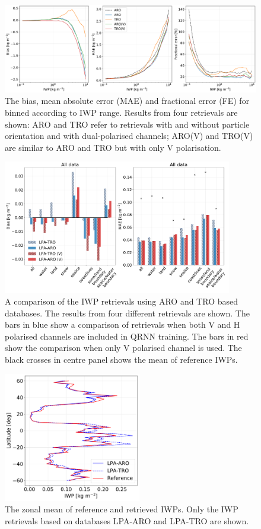 \documentclass[amt, manuscript]{copernicus}
\begin{document}
\begin{figure}[t]
	\includegraphics[width=12cm]{Figures/IWP_statistics.pdf}
	\caption{The bias, mean absolute error (MAE) and fractional error (FE) for binned according to IWP range. Results from four retrievals are shown: ARO and TRO refer to retrievals with and without particle orientation and with dual-polarised channels; ARO(V) and TRO(V) are similar to ARO and TRO but with only V polarisation. }
	\label{fig:IWP_stats}
\end{figure}



\begin{figure}[t]
	\includegraphics[width=10cm]{Figures/ARO_TRO_v_vh_all.pdf}
	\caption{A comparison of the IWP retrievals using ARO and TRO based databases. The results from four different retrievals are shown. The bars in blue show a comparison of retrievals when both V  and H  polarised channels are included in QRNN training. The bars in red show the comparison when only V  polarised channel is used. The black crosses in centre panel shows the mean of reference IWPs.  }
	\label{fig:bias_ARO_TRO}
\end{figure}

\begin{figure}[t]
	\includegraphics[width=6cm]{Figures/zonal_mean_all_jan_testdata.pdf}
	\caption{The zonal mean of reference and retrieved IWPs. Only the  IWP retrievals based on databases LPA-ARO and LPA-TRO are shown.}
	\label{fig:zonal_mean_test}
\end{figure}
\end{document}
